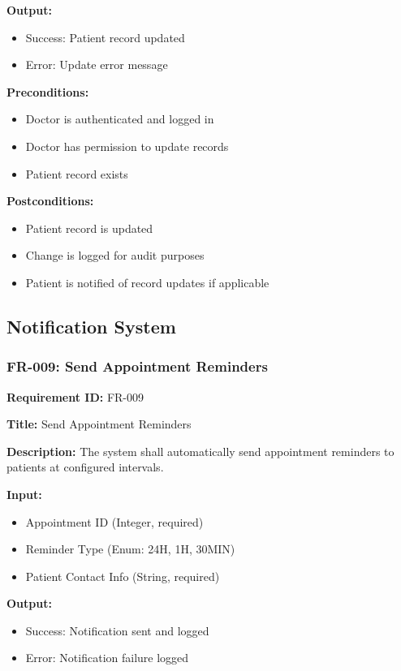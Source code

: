\documentclass[12pt,a4paper]{article}
\begin{document}
\textbf{Output:}
\begin{itemize}
    \item Success: Patient record updated
    \item Error: Update error message
\end{itemize}

\textbf{Preconditions:}
\begin{itemize}
    \item Doctor is authenticated and logged in
    \item Doctor has permission to update records
    \item Patient record exists
\end{itemize}

\textbf{Postconditions:}
\begin{itemize}
    \item Patient record is updated
    \item Change is logged for audit purposes
    \item Patient is notified of record updates if applicable
\end{itemize}

\subsection{Notification System}

\subsubsection{FR-009: Send Appointment Reminders}

\textbf{Requirement ID:} FR-009

\textbf{Title:} Send Appointment Reminders

\textbf{Description:} The system shall automatically send appointment reminders to patients at configured intervals.

\textbf{Input:}
\begin{itemize}
    \item Appointment ID (Integer, required)
    \item Reminder Type (Enum: 24H, 1H, 30MIN)
    \item Patient Contact Info (String, required)
\end{itemize}

\textbf{Output:}
\begin{itemize}
    \item Success: Notification sent and logged
    \item Error: Notification failure logged
\end{itemize}
\end{document}
